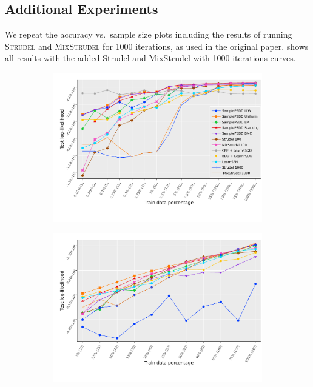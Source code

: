 \subsection{Additional Experiments}

We repeat the accuracy vs.\  sample size plots including the results of running \textsc{Strudel}
and \textsc{MixStrudel} for 1000 iterations, as used in the original paper. 
shows all results with the added Strudel and MixStrudel with 1000 iterations curves.

\begin{figure}
  \begin{subfigure}[b]{0.495\textwidth}
    \centering\includegraphics[width=\textwidth]{supplementary/all_ll_led_ensembles.pdf}
    \caption{}
  \end{subfigure}
  \begin{subfigure}[b]{0.495\textwidth}
    \centering\includegraphics[width=\textwidth]{supplementary/all_ll_led_pixels_ensembles.pdf}

\end{subfigure}
\end{figure}
